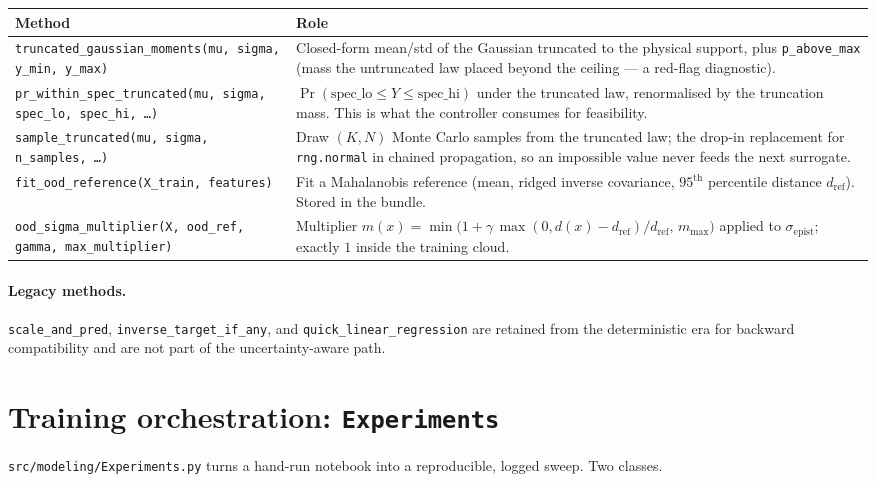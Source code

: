 \documentclass[11pt,a4paper]{article}
\newcommand{\code}[1]{\texttt{\small #1}}
\newcommand{\file}[1]{\texttt{\small #1}}
\begin{document}
\begin{longtable}{@{}p{}p{}@{}}
\toprule
\textbf{Method} & \textbf{Role} \\
\midrule
\endhead
\code{truncated\_gaussian\_moments(mu, sigma, y\_min, y\_max)} &
  Closed-form mean/std of the Gaussian truncated to the physical support, plus
  \code{p\_above\_max} (mass the untruncated law placed beyond the ceiling --- a
  red-flag diagnostic). \\
\code{pr\_within\_spec\_truncated(mu, sigma, spec\_lo, spec\_hi, \dots)} &
  $\Pr(\text{spec\_lo}\le Y\le\text{spec\_hi})$ under the truncated law,
  renormalised by the truncation mass. This is what the controller consumes for
  feasibility. \\
\code{sample\_truncated(mu, sigma, n\_samples, \dots)} &
  Draw $(K,N)$ Monte Carlo samples from the truncated law; the drop-in
  replacement for \code{rng.normal} in chained propagation, so an impossible
  value never feeds the next surrogate. \\
\code{fit\_ood\_reference(X\_train, features)} &
  Fit a Mahalanobis reference (mean, ridged inverse covariance, $95^{\text{th}}$
  percentile distance $d_{\text{ref}}$). Stored in the bundle. \\
\code{ood\_sigma\_multiplier(X, ood\_ref, gamma, max\_multiplier)} &
  Multiplier $m(x)=\min\!\big(1+\gamma\,\max(0,d(x)-d_{\text{ref}})/d_{\text{ref}},\,
  m_{\max}\big)$ applied to $\sigma_{\text{epist}}$; exactly $1$ inside the
  training cloud. \\
\bottomrule
\end{longtable}

\paragraph{Legacy methods.} \code{scale\_and\_pred},
\code{inverse\_target\_if\_any}, and \code{quick\_linear\_regression} are
retained from the deterministic era for backward compatibility and are not part
of the uncertainty-aware path.

\section{Training orchestration: \code{Experiments}}

\file{src/modeling/Experiments.py} turns a hand-run notebook into a reproducible,
logged sweep. Two classes.
\end{document}

